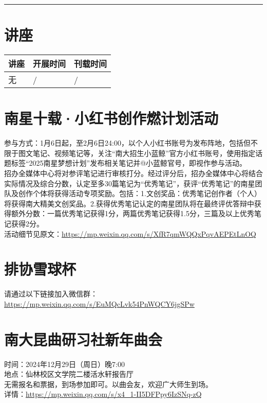 \documentclass[letterpaper, 12pt]{article}
\begin{document}
\hrule
\pagebreak
\begin{multicols}{2}

\section{讲座}
\begin{tabularx}{0.5\textwidth}{|X|X|X|}
    \hline
    讲座 & 开展时间 & 刊载时间\\
    \hline\hline
无 & / & / \\\hline

\end{tabularx}





\section{南星十载·小红书创作燃计划活动}
参与方式：1月6日起，至2月6日24:00，以个人小红书账号为发布阵地，包括但不限于图文笔记、视频笔记等，关注“南大招生小蓝鲸”官方小红书账号，使用指定话题标签“2025南星梦想计划”发布相关笔记并@小蓝鲸官号，即视作参与活动。\\
招办全媒体中心将对参评笔记进行审核打分。经过评分后，招办全媒体中心将结合实际情况及综合分数，认定至多30篇笔记为“优秀笔记”，获评“优秀笔记”的南星团队及创作个体将获得活动专项奖励。包括：1.文创奖品：优秀笔记创作者（个人）将获得南大精美文创奖品。2.获得优秀笔记认定的南星团队将在最终评优答辩中获得额外分数：一篇优秀笔记获得1分，两篇优秀笔记获得1.5分，三篇及以上优秀笔记获得2分。\\
活动细节见原文：\url{https://mp.weixin.qq.com/s/XfR7qmWQQxPqvAEPEtLnOQ}

\section{排协雪球杯}
请通过以下链接加入微信群：\url{https://mp.weixin.qq.com/s/EuMQcLvk54PnWQCY6jgSPw}

\section{南大昆曲研习社新年曲会}
时间：2024年12月29日（周日）晚7:00\\
地点：仙林校区文学院二楼活水轩报告厅\\
无需报名和票据，到场参加即可。以曲会友，欢迎广大师生到场。\\
详情：\url{https://mp.weixin.qq.com/s/x4_1-II5DFPpy6IzSNq-zQ}\\



\end{multicols}
\end{document}
